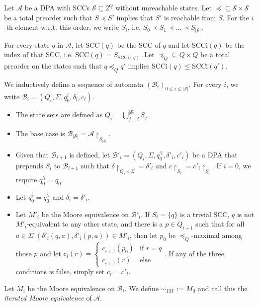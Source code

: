 \begin{defn}
\label{def:fwe:itmoore}
	Let $\mathcal{A}$ be a DPA with SCCs $\mathcal{S} \subseteq 2^Q$ without unreachable states. Let $\preceq \subseteq \mathcal{S} \times \mathcal{S}$ be a total preorder such that $S \preceq S'$ implies that $S'$ is reachable from $S$. For the $i$-th element w.r.t. this order, we write $S_i$, i.e. $S_0 \prec S_1 \prec \dots \prec S_{|\mathcal{S}|}$. 
	
	For every state $q$ in $\mathcal{A}$, let $\text{SCC}(q)$ be the SCC of $q$ and let $\text{SCCi}(q)$ be the index of that SCC, i.e. $\text{SCC}(q) = S_{\text{SCCi}(q)}$. Let $\preceq_Q \subseteq Q \times Q$ be a total preorder on the states such that $q \preceq_Q q'$ implies $\text{SCCi}(q) \leq \text{SCCi}(q')$.
	
	We inductively define a sequence of automata $(\mathcal{B}_i)_{0 \leq i \leq |\mathcal{S}|}$. For every $i$, we write $\mathcal{B}_i = (Q_i, \Sigma, q_0^i, \delta_i, c_i)$.
	
	\begin{itemize}
		\item The state sets are defined as $Q_i = \bigcup_{j=i}^{|\mathcal{S}|} S_j$.
		\item The base case is $\mathcal{B}_{|\mathcal{S}|} = \mathcal{A}\upharpoonright_{S_{|\mathcal{S}|}}$.
		\item Given that $\mathcal{B}_{i+1}$ is defined, let $\mathcal{B}'_i = (Q_i, \Sigma, q_0^{\prime i}, \delta'_i, c'_i)$ be a DPA that prepends $S_i$ to $\mathcal{B}_{i+1}$ such that $\delta \upharpoonright_{Q_i \times \Sigma} = \delta'_i$ and $c \upharpoonright_{S_i} = c'_i \upharpoonright_{S_i}$. If $i = 0$, we require $q_0^{\prime i} = q_0$.
		\item Let $q_0^i = q_0^{\prime i}$ and $\delta_i = \delta'_i$.
		\item Let $M'_i$ be the Moore equivalence on $\mathcal{B}'_i$. If $S_i = \{q\}$ is a trivial SCC, $q$ is not $M'_i$-equivalent to any other state, and there is a $p \in Q_{i+1}$ such that for all $a \in \Sigma$ $(\delta'_i(q, a), \delta'_i(p, a)) \in M'_i$, then let $p_0$ be $\preceq_Q$-maximal among those $p$ and let $c_i(r) = \begin{cases} c_{i+1}(p_0) & \text{if } r = q \\ c_{i+1}(r) & \text{else} \end{cases}$. If any of the three conditions is false, simply set $c_i = c'_i$.
	\end{itemize} 
	
	Let $M_i$ be the Moore equivalence on $\mathcal{B}_i$. We define $\sim_{IM} \,:= M_0$ and call this the \emph{iterated Moore equivalence} of $\mathcal{A}$.
\end{defn}

